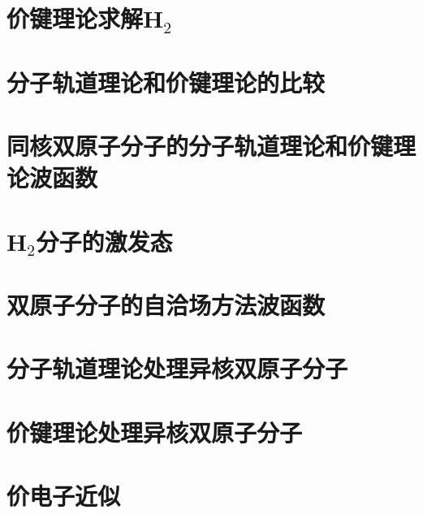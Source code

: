 \section{价键理论求解H$_2$}
\label{sec:13.10 The Valence-Bond Treatment of H$_2$}

\section{分子轨道理论和价键理论的比较}
\label{sec:13.11 Comparison of the MO and VB Theories}

\section{同核双原子分子的分子轨道理论和价键理论波函数}
\label{sec:13.12 MO and VB Wave Functions for Homonuclear Diatomic Molecules}

\section{H$_2$分子的激发态}
\label{sec:13.13 Excited States of H$_2$}

\section{双原子分子的自洽场方法波函数}
\label{sec:13.14 SCF Wave Functions for Diatomic Molecules}

\section{分子轨道理论处理异核双原子分子}
\label{sec:13.15 MO Treatment of Heteronuclear Diatomic Molecules}

\section{价键理论处理异核双原子分子}
\label{sec:13.16 VB Treatment of Heteronuclear Diatomic Molecules}

\section{价电子近似}
\label{sec:13.17 The Valence-Electron Approximation}